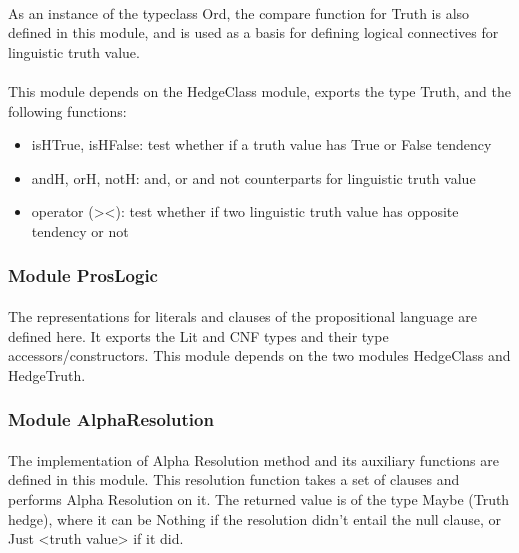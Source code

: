 \documentclass[../gr-final.tex]{subfiles}
\begin{document}
\paragraph{}As an instance of the typeclass Ord, the compare
function for Truth is also defined in this module, and is used as
a basis for defining logical connectives for linguistic truth
value.\\

\paragraph{}This module depends on the HedgeClass module, exports the type Truth, and the following functions:

\begin{itemize}
\item isHTrue, isHFalse: test whether if a truth value has True or
  False tendency 
\item andH, orH, notH: and, or and not counterparts for
  linguistic truth value 
\item operator (><): test whether if two linguistic
  truth value has opposite tendency or not
\end{itemize}


\subsubsection{Module ProsLogic}

\paragraph{}The representations for literals and clauses of the propositional language are defined here. It exports the Lit and CNF types and their type accessors/constructors. This module depends on the two modules HedgeClass and HedgeTruth.


\subsubsection{Module AlphaResolution}

\paragraph{}The implementation of Alpha Resolution method and its auxiliary functions are defined in this module. This resolution function takes a set of clauses and performs Alpha Resolution on it. The returned value is of the type Maybe (Truth hedge), where it can be Nothing if the resolution didn't entail the null clause, or Just <truth value> if it did.\\
\end{document}
